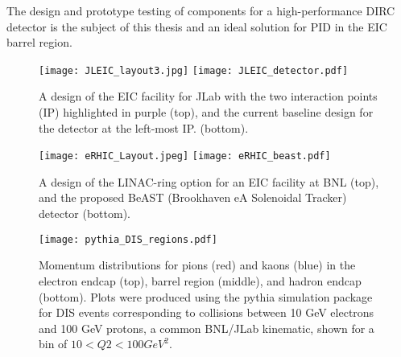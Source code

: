 The design and prototype testing of components for a high-performance DIRC detector is the subject of this thesis and an ideal solution for PID in the EIC barrel region.


\begin{figure}[!htb]
	\centering
	\texttt{[image: JLEIC\_layout3.jpg]}
	\texttt{[image: JLEIC\_detector.pdf]}
	\caption{A design of the EIC facility for JLab with the two interaction points (IP) highlighted in purple (top), and the current baseline design for the detector at the left-most IP. (bottom).}
	\label{fig:jleic_layout}
\end{figure}

\begin{figure}[!htb]
	\centering
	\texttt{[image: eRHIC\_Layout.jpeg]}
	\texttt{[image: eRHIC\_beast.pdf]}
	\caption{A design of the LINAC-ring option for an EIC facility at BNL (top), and the proposed BeAST (Brookhaven eA Solenoidal Tracker) detector (bottom).}
	\label{fig:erhic_layout}
\end{figure}

\begin{figure}[!htb]
	\centering
	\texttt{[image: pythia\_DIS\_regions.pdf]}
	\caption{Momentum distributions for pions (red) and kaons (blue) in the electron endcap (top), barrel region (middle), and hadron endcap (bottom). Plots were produced using the pythia simulation package for DIS events corresponding to collisions between 10 GeV electrons and 100 GeV protons, a common BNL/JLab kinematic, shown for a bin of $10<Q2<100\unit{GeV}^2$.}
	\label{fig:pythia_DIS}
\end{figure}
